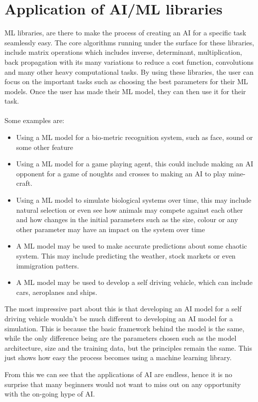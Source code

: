 \section{Application of AI/ML libraries}
ML libraries, are there to make the process of creating an AI for a specific task seamlessly easy. The core algorithms running under the surface for these libraries, include matrix operations which includes inverse, determinant, multiplication, back propagation with its many variations to reduce a cost function, convolutions and many other heavy computational tasks. By using these libraries, the user can focus on the important tasks such as choosing the best parameters for their ML models. Once the user has made their ML model, they can then use it for their task. 
\\ \\
Some examples are:
\begin{itemize}
    \item Using a ML model for a bio-metric recognition system, such as face, sound or some other feature
    \item Using a ML model for a game playing agent, this could include making an AI opponent for a game of noughts and crosses to making an AI to play mine-craft.
    \item Using a ML model to simulate biological systems over time, this may include natural selection or even see how animals may compete against each other and how changes in the initial parameters such as the size, colour or any other parameter may have an impact on the system over time 
    \item A ML model may be used to make accurate predictions about some chaotic system. This may include predicting the weather, stock markets or even immigration patters.
    \item A ML model may be used to develop a self driving vehicle, which can include cars, aeroplanes and ships.
\end{itemize}
The most impressive part about this is that developing an AI model for a self driving vehicle wouldn't be much different to developing an AI model for a simulation. This is because the basic framework behind the model is the same, while the only difference being are the parameters chosen such as the model architecture, size and the training data, but the principles remain the same. This just shows how easy the process becomes using a machine learning library. 

From this we can see that the applications of AI are endless, hence it is no surprise that many beginners would not want to miss out on any opportunity with the on-going hype of AI.

